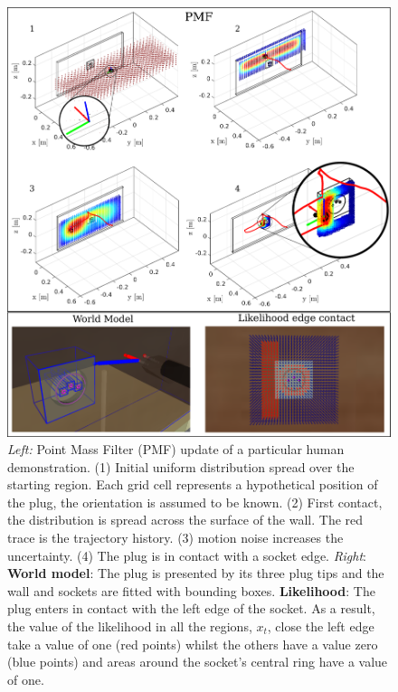 \begin{figure}
 \centering
   \includegraphics[width=\textwidth]{./ch4-PiH/Figures/PMF/pmf_likelihood_v2.pdf}
   \caption{\textit{Left:} Point Mass Filter (PMF) update of a particular human demonstration. (1) Initial uniform distribution spread over the starting 
   region. Each grid cell represents a hypothetical position of the plug, the orientation is assumed to be known. (2) First contact, the distribution 
   is spread across the surface of the wall. The red trace is the trajectory history. (3) motion noise increases the uncertainty. (4) The plug is in contact with a socket edge.
   \textit{Right}: \textbf{World model}: The plug is presented by its three plug tips and the wall and sockets are fitted with bounding boxes.
   \textbf{Likelihood}: The plug enters in contact with the left edge of the socket. As a result, the value of the likelihood in all the regions, $x_t$, close the left edge take 
   a value of one (red points)  whilst the others have a value zero (blue points) and areas around the socket's central 
   ring have a value of one. }
  \label{fig:PMF}
\end{figure}

